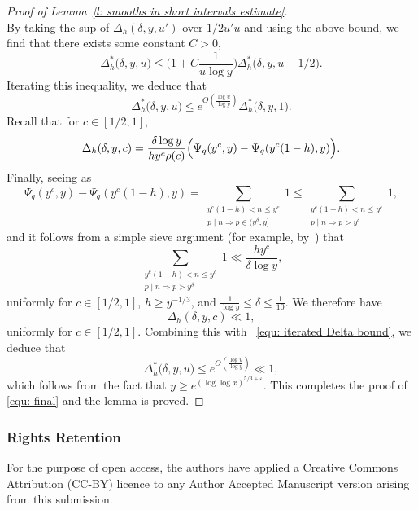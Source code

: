 \documentclass[12pt,a4paper,reqno]{amsart}
\numberwithin{equation}{section}
\def\leq {\leqslant}
\theoremstyle{remark}
\theoremstyle{definition}
\numberwithin{equation}{section}
\theoremstyle{remark}
\begin{document}
\begin{proof}[Proof of Lemma~\ref{l: smooths in short intervals estimate}]
\[\]
By taking the sup of $\Delta_h (\delta,y,u')$ over $1/2 u' u$ and using the above bound, we find that there exists some constant $C > 0$,
\[
\Delta_h^* \bigl( \delta, y, u \bigr) \leq \biggl( 1 + C\frac{1}{u \log y} \biggr) \Delta_h^* \bigl( \delta, y, u - 1/2 \bigr) .
\]
Iterating this inequality, we deduce that
\begin{equation}\label{equ: iterated Delta bound}
\Delta_h^* \bigl( \delta, y, u \bigr) \leq e^{O(\frac{\log u}{\log y})} \Delta_h^* \bigl( \delta, y, 1 \bigr) .
\end{equation}
Recall that for $c \in [1/2, 1]$, 
\[
\Delta_h (\delta, y, c) = \frac{\delta \log y}{h y^c \rho(c)} \Bigl( \Psi_q (y^c , y) - \Psi_q (y^c (1-h), y) \Bigr) .
\]
Finally, seeing as
\[
\Psi_q (y^c, y) - \Psi_q (y^c (1-h), y) = \sum_{\substack{y^c (1-h) < n \leq y^c \\ p \mid n \Rightarrow p \in (y^\delta, y]}} 1 \leq \sum_{\substack{y^c (1-h) < n \leq y^c \\ p \mid n \Rightarrow p > y^{\delta}}} 1 , 
\]
and it follows from a simple sieve argument (for example, by~\cite[Theorem~3.6]{MV2007}) that
\[
\sum_{\substack{y^c (1-h) < n \leq y^c \\ p \mid n \Rightarrow p > y^{\delta}}} 1 \ll \frac{h y^c}{\delta \log y},
\]
uniformly for $c \in [1/2,1]$, $h \geq y^{-1/3}$, and $\frac{1}{\log y} \leq \delta \leq \frac{1}{10}$. We therefore have
\[
\Delta_h (\delta, y, c) \ll 1,
\]
uniformly for $c \in [1/2,1]$. Combining this with
~\eqref{equ: iterated Delta bound}, we deduce that 
\[\Delta_h^* \bigl( \delta, y, u \bigr) \leq e^{O(\frac{\log u}{\log y})} \ll  1,\]
which follows from the fact that $y \geq e^{(\log \log x)^{5/3 + \varepsilon}}$. This completes the proof of \eqref{equ: final} and the lemma is proved. 

\end{proof}

\subsubsection*{Rights Retention}
For the purpose of open access, the authors have applied a Creative Commons Attribution (CC-BY) licence to any Author Accepted Manuscript version arising from this submission.


	{}
\end{document}
